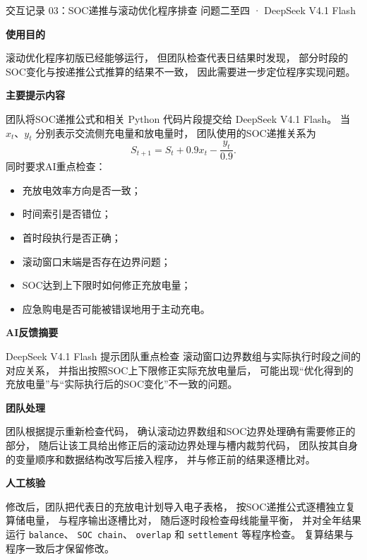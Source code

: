 \documentclass[UTF8,a4paper,11pt]{ctexart}
\newcommand{\recorditem}[1]{%
    \par\vspace{0.28em}
    \noindent\textbf{#1}\quad
}
\begin{document}
\begin{recordbox}
{交互记录 03：SOC递推与滚动优化程序排查}
{问题二至四 · DeepSeek V4.1 Flash}

\recorditem{使用目的}
滚动优化程序初版已经能够运行，
但团队检查代表日结果时发现，
部分时段的SOC变化与按递推公式推算的结果不一致，
因此需要进一步定位程序实现问题。

\recorditem{主要提示内容}
团队将SOC递推公式和相关 Python 代码片段提交给
DeepSeek V4.1 Flash。
当 $x_t$、$y_t$ 分别表示交流侧充电量和放电量时，
团队使用的SOC递推关系为
\[
S_{t+1}
=
S_t+0.9x_t-\frac{y_t}{0.9}.
\]
同时要求AI重点检查：
\begin{itemize}
    \item 充放电效率方向是否一致；
    \item 时间索引是否错位；
    \item 首时段执行是否正确；
    \item 滚动窗口末端是否存在边界问题；
    \item SOC达到上下限时如何修正充放电量；
    \item 应急购电是否可能被错误地用于主动充电。
\end{itemize}

\recorditem{AI反馈摘要}
DeepSeek V4.1 Flash 提示团队重点检查
滚动窗口边界数组与实际执行时段之间的对应关系，
并指出按照SOC上下限修正实际充放电量后，
可能出现“优化得到的充放电量”与“实际执行后的SOC变化”不一致的问题。

\recorditem{团队处理}
团队根据提示重新检查代码，
确认滚动边界数组和SOC边界处理确有需要修正的部分，
随后让该工具给出修正后的滚动边界处理与槽内裁剪代码，
团队按其自身的变量顺序和数据结构改写后接入程序，
并与修正前的结果逐槽比对。

\recorditem{人工核验}
修改后，团队把代表日的充放电计划导入电子表格，
按SOC递推公式逐槽独立复算储电量，
与程序输出逐槽比对，
随后逐时段检查母线能量平衡，
并对全年结果运行
\texttt{balance}、
\texttt{SOC chain}、
\texttt{overlap} 和
\texttt{settlement}
等程序检查。
复算结果与程序一致后才保留修改。
\end{recordbox}
\end{document}
